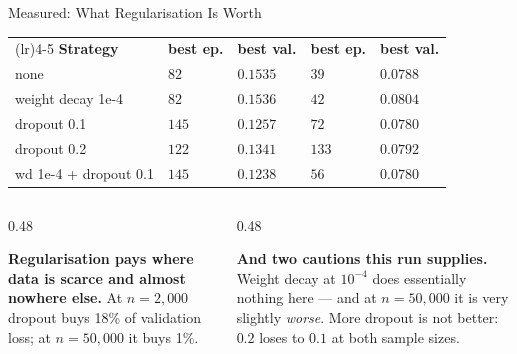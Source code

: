 \begin{frame}{Measured: What Regularisation Is Worth}
\vspace{-1mm}
\begin{center}\footnotesize
\begin{tabularx}{\linewidth}{@{}>{\raggedright\arraybackslash}X >{\raggedleft\arraybackslash}p{1.6cm} >{\raggedleft\arraybackslash}p{1.8cm} >{\raggedleft\arraybackslash}p{1.6cm} >{\raggedleft\arraybackslash}p{1.8cm}@{}}
\toprule
& \multicolumn{2}{c}{$n=2{,}000$} & \multicolumn{2}{c}{$n=50{,}000$} \\
\cmidrule(lr){2-3}\cmidrule(lr){4-5}
\textbf{Strategy} & \textbf{best ep.} & \textbf{best val.} & \textbf{best ep.} & \textbf{best val.} \\
\midrule
none & $82$ & $0.1535$ & $39$ & $0.0788$ \\
weight decay 1e-4 & $82$ & $0.1536$ & $42$ & $0.0804$ \\
dropout 0.1 & $145$ & $0.1257$ & $72$ & $0.0780$ \\
dropout 0.2 & $122$ & $0.1341$ & $133$ & $0.0792$ \\
wd 1e-4 + dropout 0.1 & $145$ & $0.1238$ & $56$ & $0.0780$ \\
\bottomrule
\end{tabularx}
\end{center}
\medskip
\begin{columns}[T]
\begin{column}{0.48\textwidth}
\begin{takeawaybox}\footnotesize
\textbf{Regularisation pays where data is scarce and almost nowhere else.} At $n=2{,}000$ dropout buys 18\% of validation loss; at $n=50{,}000$ it buys 1\%.
\end{takeawaybox}
\end{column}
\begin{column}{0.48\textwidth}
\begin{cautionbox}\footnotesize
\textbf{And two cautions this run supplies.} Weight decay at $10^{-4}$ does essentially nothing here --- and at $n=50{,}000$ it is very slightly \emph{worse}. More dropout is not better: $0.2$ loses to $0.1$ at both sample sizes.
\end{cautionbox}
\end{column}
\end{columns}
\vspace{1mm}
\end{frame}

